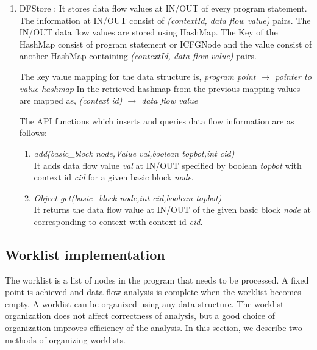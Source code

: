 \documentclass[12pt]{report}
\begin{document}
\begin{enumerate}
\item DFStore : It stores data flow values at IN/OUT of every program statement. The information at IN/OUT consist of \emph{(contextId, data flow value)} pairs. The IN/OUT data flow values are stored using HashMap. The Key of the HashMap  consist of program statement or ICFGNode and the value consist of another HashMap containing \emph{(contextId, data flow value)} pairs.

The key value mapping for the data structure is,
\newline
\emph{program point $\rightarrow $ pointer to value hashmap}
\newline
\newline
In the retrieved hashmap from the previous mapping values are mapped as, 
\newline
\emph{(context id) $\rightarrow $ data flow value}
\newline
\newline

The API functions which inserts and queries data flow information are as follows:
\begin{enumerate}
\item \emph{add(basic\_block node,Value val,boolean topbot,int cid)} \\
It adds data flow value \emph{val} at IN/OUT specified by boolean \emph{topbot} with context id \emph{cid} for a given basic block \emph{node}. 
\item \emph{Object get(basic\_block node,int cid,boolean topbot)} \\
It returns the data flow value at IN/OUT of the given basic block \emph{node} at corresponding to context with context id \emph{cid}.
\end {enumerate}

\end{enumerate}

\subsection{Worklist implementation}

The worklist is a list of nodes in the program that needs to be processed. A fixed point is achieved and data flow analysis is complete when the worklist becomes empty. A worklist can be organized using any data structure. The worklist organization does not affect correctness of analysis, but a good choice of organization improves efficiency of the analysis. In this section, we describe two methods of organizing worklists.
\end{document}
